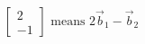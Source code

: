 \documentclass[preview]{standalone}
\begin{document}
\begin{align*}
\begin{bmatrix}2\\-1\end{bmatrix}\text{ means }2\vec b_1-\vec b_2
\end{align*}
\end{document}
